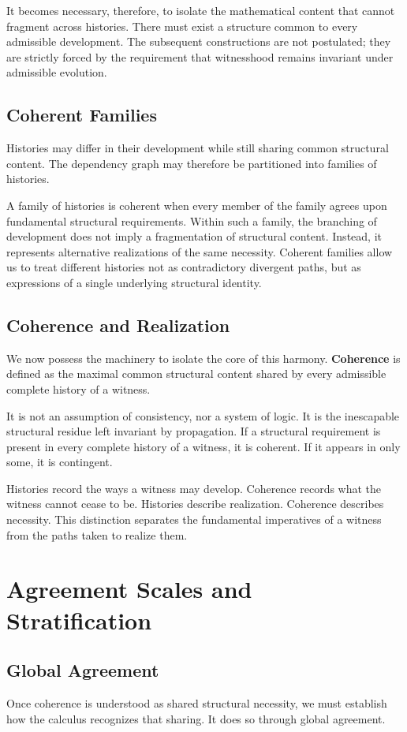 \documentclass[12pt,anyside]{book}
\begin{document}
It becomes necessary, therefore, to isolate the mathematical content that cannot fragment across histories. There must exist a structure common to every admissible development. The subsequent constructions are not postulated; they are strictly forced by the requirement that witnesshood remains invariant under admissible evolution.

\subsection{Coherent Families}
Histories may differ in their development while still sharing common structural content. The dependency graph may therefore be partitioned into families of histories. 

A family of histories is coherent when every member of the family agrees upon fundamental structural requirements. Within such a family, the branching of development does not imply a fragmentation of structural content. Instead, it represents alternative realizations of the same necessity. Coherent families allow us to treat different histories not as contradictory divergent paths, but as expressions of a single underlying structural identity.

\subsection{Coherence and Realization}
We now possess the machinery to isolate the core of this harmony. \textbf{Coherence} is defined as the maximal common structural content shared by every admissible complete history of a witness. 

It is not an assumption of consistency, nor a system of logic. It is the inescapable structural residue left invariant by propagation. If a structural requirement is present in every complete history of a witness, it is coherent. If it appears in only some, it is contingent. 

Histories record the ways a witness may develop. Coherence records what the witness cannot cease to be. Histories describe realization. Coherence describes necessity. This distinction separates the fundamental imperatives of a witness from the paths taken to realize them.

\section{Agreement Scales and Stratification}

\subsection{Global Agreement}
Once coherence is understood as shared structural necessity, we must establish how the calculus recognizes that sharing. It does so through global agreement.
\end{document}
